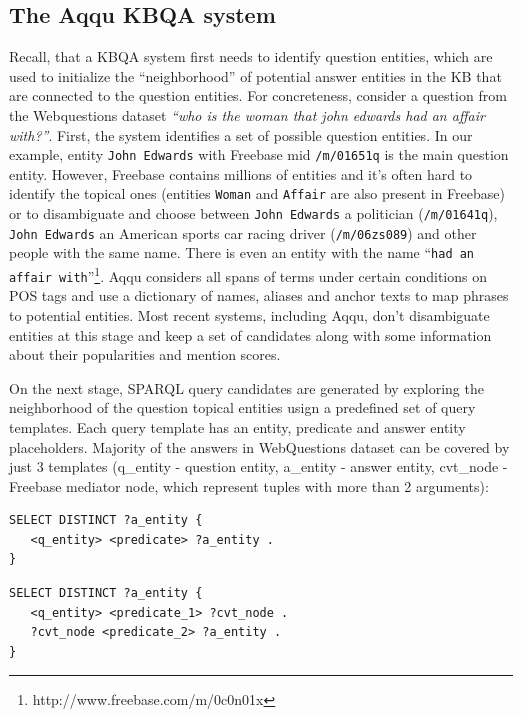 \subsection{The Aqqu KBQA system}
Recall, that a KBQA system first needs to identify question entities, which are used to initialize the ``neighborhood'' of potential answer entities in the KB that are connected to the question entities. For concreteness, consider a question from the Webquestions dataset \textit{``who is the woman that john edwards had an affair with?''}.
First, the system identifies a set of possible question entities.
In our example, entity \texttt{John Edwards} with Freebase mid \texttt{/m/01651q} is the main question entity.
However, Freebase contains millions of entities and it's often hard to identify the topical ones (\eg entities \texttt{Woman} and \texttt{Affair} are also present in Freebase) or to disambiguate and choose between \texttt{John Edwards} a politician (\texttt{/m/01641q}), \texttt{John Edwards} an American sports car racing driver (\texttt{/m/06zs089}) and other people with the same name.
There is even an entity with the name ``\texttt{had an affair with}''\footnote{http://www.freebase.com/m/0c0n01x}.
Aqqu considers all spans of terms under certain conditions on POS tags and use a dictionary of names, aliases and anchor texts \cite{SPITKOVSKY12.266} to map phrases to potential entities.
Most recent systems, including Aqqu, don't disambiguate entities at this stage and keep a set of candidates along with some information about their popularities and mention scores.

On the next stage, SPARQL query candidates are generated by exploring the neighborhood of the question topical entities usign a predefined set of query templates.
Each query template has an entity, predicate and answer entity placeholders.
Majority of the answers in WebQuestions dataset can be covered by just 3 templates (q\_entity - question entity, a\_entity - answer entity, cvt\_node - Freebase mediator node, which represent tuples with more than 2 arguments):

\begin{lstlisting}[frame=single,basicstyle=\small]
SELECT DISTINCT ?a_entity {
   <q_entity> <predicate> ?a_entity .
}
\end{lstlisting}

\vspace{-0.25cm}
\begin{lstlisting}[frame=single,basicstyle=\small]
SELECT DISTINCT ?a_entity {
   <q_entity> <predicate_1> ?cvt_node .
   ?cvt_node <predicate_2> ?a_entity .
}
\end{lstlisting}

